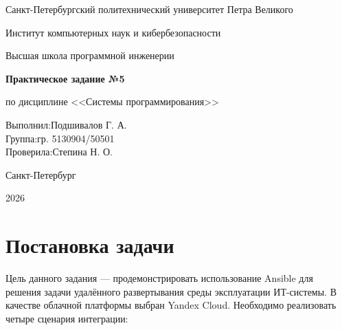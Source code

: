 \documentclass[12pt,a4paper]{article}
\begin{document}
\begin{titlepage}
    \centering
    {\normalsize Санкт-Петербургский политехнический университет Петра Великого\par}
    {\normalsize Институт компьютерных наук и кибербезопасности\par}
    {\normalsize Высшая школа программной инженерии\par}

    \vspace{4cm}

    {\Huge\bfseries Практическое задание №5\par}

    \vspace{0.5cm}
    {\large по дисциплине <<Системы программирования>>\par}

    \vfill

    \begin{flushleft}
        \noindent Выполнил:\hfill Подшивалов Г. А.\\[0.3em]
        \noindent Группа:\hfill гр. 5130904/50501\\[0.3em]
        \noindent Проверила:\hfill Степина Н. О.
    \end{flushleft}

    \vfill

    {\normalsize Санкт-Петербург\par}
    {\normalsize 2026\par}
\end{titlepage}

\tableofcontents
\newpage

\section{Постановка задачи}

Цель данного задания — продемонстрировать использование Ansible для решения задачи удалённого развертывания среды эксплуатации ИТ-системы. В качестве облачной платформы выбран Yandex Cloud. Необходимо реализовать четыре сценария интеграции:
\end{document}
